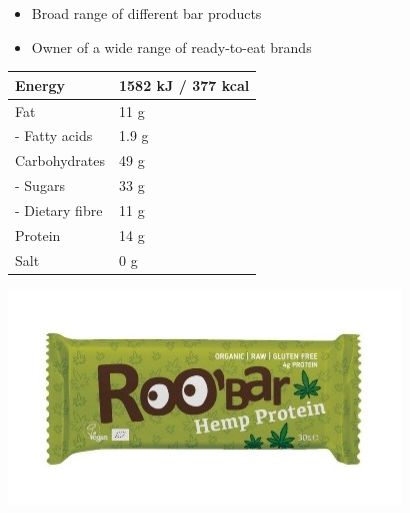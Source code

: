 \noindent
\begin{minipage}[t]{0.48\textwidth}
  \vspace{0pt}
  \begin{itemize}
    \item Broad range of different bar products
    \item Owner of a wide range of ready-to-eat brands
  \end{itemize}
\vspace{1em}
  \medskip %
  \raggedright
  \label{tab:your_label}
  \begin{tabular}{|l|l|}
    \hline
    Energy & 1582 kJ / 377 kcal \\ \hline
    Fat & 11 g \\ \hline
    - Fatty acids & 1.9 g \\ \hline
    Carbohydrates & 49 g \\ \hline
    - Sugars & 33 g \\ \hline
    - Dietary fibre & 11 g \\ \hline
    Protein & 14 g \\ \hline
    Salt & 0 g \\ \hline
  \end{tabular}
\end{minipage}\hfill
\begin{minipage}[t]{0.48\textwidth}
  \vspace{0pt}
  \centering
  \includegraphics[width=\linewidth]{Figures/fig_03.jpg}
  \label{fig:introduction_03}
\end{minipage}

  
  
\vspace{2em}
